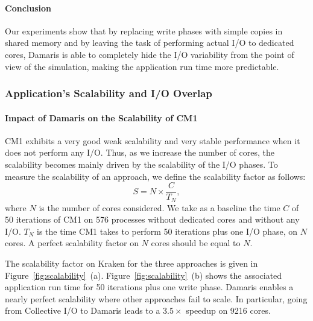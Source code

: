 \paragraph{Conclusion} Our experiments show that by replacing write phases with simple copies in 
shared memory and by leaving the task of performing actual I/O to dedicated 
cores, Damaris is able to completely hide the I/O variability from the point of view 
of the simulation, making the application run time more predictable.


\subsubsection{Application's Scalability and I/O Overlap}\label{sec:damaris:scalability}

\paragraph{Impact of Damaris on the Scalability of CM1} CM1 exhibits a very good weak 
scalability and very stable performance when it does not perform any I/O. 
Thus, as we increase the number of cores, the scalability becomes mainly driven by the 
scalability of the I/O phases. To measure the scalability of an approach, 
we define the scalability factor as follows:
\begin{equation}
S = N\times\frac{C}{T_{N}},
\end{equation}
where $N$ is the number of cores considered. We take as a baseline the time 
$C$ of 50 iterations of CM1 on 576 processes without dedicated cores and 
without any I/O. $T_{N}$ is the time CM1 takes to perform 50 iterations
plus one I/O phase, on $N$ cores.
A perfect scalability factor on $N$ cores should be equal to $N$.

The scalability factor on Kraken for the three approaches is given in 
Figure~\ref{fig:scalability}~(a).
Figure~\ref{fig:scalability}~(b) shows the associated application run time 
for 50 iterations plus one write phase.
Damaris enables a nearly perfect scalability where other approaches fail to scale.
In particular, going from Collective I/O to Damaris leads to a $3.5\times$ speedup
on 9216 cores.

